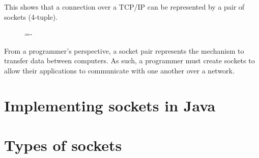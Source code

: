 \documentclass[a4paper]{systems-software}
\begin{document}
This shows that a connection over a TCP/IP can be represented by a pair of sockets (4-tuple).

\begin{figure}[H]
	\lineskip=-\fboxrule
\end{figure}

From a programmer's perspective, a socket pair represents the mechanism to transfer data between computers. As such, a programmer must create sockets to allow their applications to communicate with one another over a network.


\newpage

\section{Implementing sockets in Java}
\label{chap:13}

\section*{Types of sockets}
\end{document}

